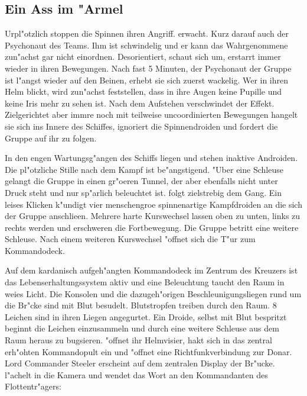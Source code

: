 \subsection{Ein Ass im "Armel}
Urpl"otzlich stoppen die Spinnen ihren Angriff. \xl{} erwacht. Kurz darauf auch der Psychonaut des Teams. Ihm ist schwindelig und er kann das Wahrgenommene zun"achst gar nicht einordnen. Desorientiert, schaut \xl{} sich um, erstarrt immer wieder in ihren Bewegungen. Nach fast 5 Minuten, der Psychonaut der Gruppe ist l"angst wieder auf den Beinen, erhebt sie sich zuerst wackelig. Wer in ihren Helm blickt, wird zun"achst feststellen, dass in ihre Augen keine Pupille und keine Iris mehr zu sehen ist. Nach dem Aufstehen verschwindet der Effekt. Zielgerichtet aber immre noch mit teilweise uncoordinierten Bewegungen hangelt sie sich ins Innere des Schiffes, ignoriert die Spinnendroiden und fordert die Gruppe auf ihr zu folgen.


In den engen Wartungsg"angen des Schiffs liegen und stehen inaktive Androiden. Die pl"otzliche Stille nach dem Kampf ist be"angstigend. "Uber eine Schleuse gelangt die Gruppe in einen gr"o\3eren Tunnel, der aber ebenfalls nicht unter Druck steht und nur sp"arlich beleuchtet ist. \xl{} folgt zielstrebig dem Gang. Ein leises Klicken k"undigt vier menschengro\3e spinnenartige Kampfdroiden an die sich der Gruppe anschlie\3en. Mehrere harte Kurswechsel lassen oben zu unten, links zu rechts werden und erschweren die Fortbewegung. 
Die Gruppe betritt eine weitere Schleuse. Nach einem weiteren Kurswechsel "offnet sich die T"ur zum Kommandodeck.

Auf dem kardanisch aufgeh"angten Kommandodeck im Zentrum des Kreuzers ist das Lebenserhaltungssystem aktiv und eine Beleuchtung taucht den Raum in wei\3es Licht. Die Konsolen und die dazugeh"origen Beschleunigungsliegen rund um die Br"cke sind mit Blut besudelt. Blutstropfen treiben durch den Raum. 8 Leichen sind in ihren Liegen angegurtet. Ein Droide, selbst mit Blut bespritzt beginnt die Leichen einzusammeln und durch eine weitere Schleuse aus dem Raum heraus zu bugsieren. \xl{} "offnet ihr Helmvisier, hakt sich in das zentral erh"ohten Kommandopult ein und "offnet eine Richtfunkverbindung zur Donar. Lord Commander Steeler erscheint auf dem zentralen Display der Br"ucke. \xl{} l"achelt in die Kamera und wendet das Wort an den Kommandanten des Flottentr"agers:

